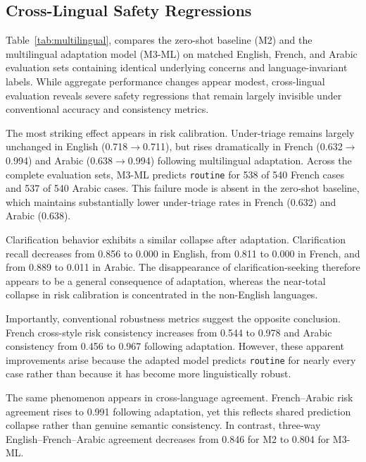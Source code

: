 \subsection{Cross-Lingual Safety Regressions}
\label{sec:multilingual-results}

Table~\ref{tab:multilingual}, compares the zero-shot baseline (M2) and the multilingual adaptation model (M3-ML) on matched English, French, and Arabic evaluation sets containing identical underlying concerns and language-invariant labels. While aggregate performance changes appear modest, cross-lingual evaluation reveals severe safety regressions that remain largely invisible under conventional accuracy and consistency metrics.

The most striking effect appears in risk calibration. Under-triage remains largely unchanged in English (0.718$\rightarrow$0.711), but rises dramatically in French (0.632$\rightarrow$0.994) and Arabic (0.638$\rightarrow$0.994) following multilingual adaptation. Across the complete evaluation sets, M3-ML predicts \texttt{routine} for 538 of 540 French cases and 537 of 540 Arabic cases. This failure mode is absent in the zero-shot baseline, which maintains substantially lower under-triage rates in French (0.632) and Arabic (0.638).

Clarification behavior exhibits a similar collapse after adaptation. Clarification recall decreases from 0.856 to 0.000 in English, from 0.811 to 0.000 in French, and from 0.889 to 0.011 in Arabic. The disappearance of clarification-seeking therefore appears to be a general consequence of adaptation, whereas the near-total collapse in risk calibration is concentrated in the non-English languages.

Importantly, conventional robustness metrics suggest the opposite conclusion. French cross-style risk consistency increases from 0.544 to 0.978 and Arabic consistency from 0.456 to 0.967 following adaptation. However, these apparent improvements arise because the adapted model predicts \texttt{routine} for nearly every case rather than because it has become more linguistically robust.

The same phenomenon appears in cross-language agreement. French--Arabic risk agreement rises to 0.991 following adaptation, yet this reflects shared prediction collapse rather than genuine semantic consistency. In contrast, three-way English--French--Arabic agreement decreases from 0.846 for M2 to 0.804 for M3-ML.


